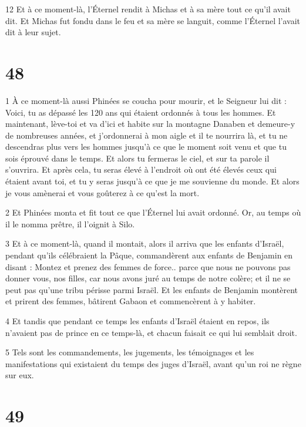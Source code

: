 \par 12 Et à ce moment-là, l'Éternel rendit à Michas et à sa mère tout ce qu'il avait dit. Et Michas fut fondu dans le feu et sa mère se languit, comme l'Éternel l'avait dit à leur sujet.

\chapter{48}

\par 1 À ce moment-là aussi Phinées se coucha pour mourir, et le Seigneur lui dit : Voici, tu as dépassé les 120 ans qui étaient ordonnés à tous les hommes. Et maintenant, lève-toi et va d'ici et habite sur la montagne Danaben et demeure-y de nombreuses années, et j'ordonnerai à mon aigle et il te nourrira là, et tu ne descendras plus vers les hommes jusqu'à ce que le moment soit venu et que tu sois éprouvé dans le temps. Et alors tu fermeras le ciel, et sur ta parole il s'ouvrira. Et après cela, tu seras élevé à l'endroit où ont été élevés ceux qui étaient avant toi, et tu y seras jusqu'à ce que je me souvienne du monde. Et alors je vous amènerai et vous goûterez à ce qu'est la mort.

\par 2 Et Phinées monta et fit tout ce que l'Éternel lui avait ordonné. Or, au temps où il le nomma prêtre, il l'oignit à Silo.

\par 3 Et à ce moment-là, quand il montait, alors il arriva que les enfants d'Israël, pendant qu'ils célébraient la Pâque, commandèrent aux enfants de Benjamin en disant : Montez et prenez des femmes de force.. parce que nous ne pouvons pas donner vous, nos filles, car nous avons juré au temps de notre colère; et il ne se peut pas qu'une tribu périsse parmi Israël. Et les enfants de Benjamin montèrent et prirent des femmes, bâtirent Gabaon et commencèrent à y habiter.

\par 4 Et tandis que pendant ce temps les enfants d'Israël étaient en repos, ils n'avaient pas de prince en ce temps-là, et chacun faisait ce qui lui semblait droit.

\par 5 Tels sont les commandements, les jugements, les témoignages et les manifestations qui existaient du temps des juges d'Israël, avant qu'un roi ne règne sur eux.

\chapter{49}

